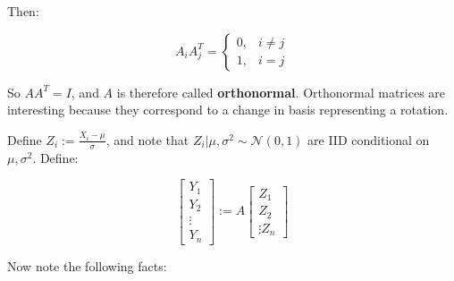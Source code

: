 \documentclass[a4paper]{article}
\begin{document}
                    Then:

                    \[
                        A_iA_j^T = \begin{cases}0, & i \neq j \\ 1, & i = j
                        \end{cases}
                    \]

                    So $AA^T = I$, and $A$ is therefore called
                    \textbf{orthonormal}. Orthonormal matrices are interesting
                    because they correspond to a change in basis representing
                    a rotation.

                    Define $Z_i := \frac{X_i - \mu}{\sigma}$, and note that $Z_i
                    | \mu, \sigma^2 \sim \mathcal{N}(0, 1)$ are IID conditional
                    on $\mu, \sigma^2$. Define:

                    \[
                        \begin{bmatrix}Y_1 \\ Y_2 \\ \vdots \\ Y_n\end{bmatrix}
                        := A\begin{bmatrix}Z_1 \\ Z_2 \\ \vdots Z_n\end{bmatrix}
                    \]

                    Now note the following facts:
\end{document}
